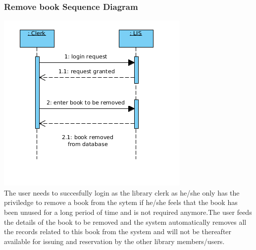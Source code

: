 \documentclass[a4paper]{article}
\begin{document}
\subsubsection*{Remove book Sequence Diagram}
\includegraphics[scale=0.50]{images/seqDiagBookRemoval.png}
\\
The user needs to succesfully login as the library clerk as he/she only has the priviledge to remove a book from the sytem if he/she feels that the book has been unused for a long period of time and is not required anymore.The user feeds the details of the book to be removed and the system automatically removes all the records related to this book from the system and will not be thereafter available for issuing and reservation by the other library members/users.
\\
\end{document}
